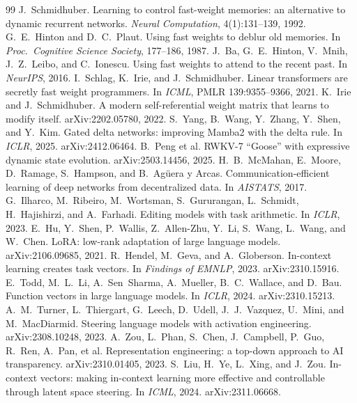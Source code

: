 \documentclass[11pt]{article}
\theoremstyle{definition}
\begin{document}
\begin{thebibliography}{99}
 J.~Schmidhuber. Learning to control fast-weight memories: an alternative to dynamic recurrent networks. \emph{Neural Computation}, 4(1):131--139, 1992.
 G.~E.~Hinton and D.~C.~Plaut. Using fast weights to deblur old memories. In \emph{Proc.\ Cognitive Science Society}, 177--186, 1987.
 J.~Ba, G.~E.~Hinton, V.~Mnih, J.~Z.~Leibo, and C.~Ionescu. Using fast weights to attend to the recent past. In \emph{NeurIPS}, 2016.
 I.~Schlag, K.~Irie, and J.~Schmidhuber. Linear transformers are secretly fast weight programmers. In \emph{ICML}, PMLR 139:9355--9366, 2021.
 K.~Irie and J.~Schmidhuber. A modern self-referential weight matrix that learns to modify itself. arXiv:2202.05780, 2022.
 S.~Yang, B.~Wang, Y.~Zhang, Y.~Shen, and Y.~Kim. Gated delta networks: improving Mamba2 with the delta rule. In \emph{ICLR}, 2025. arXiv:2412.06464.
 B.~Peng et al. RWKV-7 ``Goose'' with expressive dynamic state evolution. arXiv:2503.14456, 2025.
 H.~B.~McMahan, E.~Moore, D.~Ramage, S.~Hampson, and B.~Ag\"uera y Arcas. Communication-efficient learning of deep networks from decentralized data. In \emph{AISTATS}, 2017.
 G.~Ilharco, M.~Ribeiro, M.~Wortsman, S.~Gururangan, L.~Schmidt, H.~Hajishirzi, and A.~Farhadi. Editing models with task arithmetic. In \emph{ICLR}, 2023.
 E.~Hu, Y.~Shen, P.~Wallis, Z.~Allen-Zhu, Y.~Li, S.~Wang, L.~Wang, and W.~Chen. LoRA: low-rank adaptation of large language models. arXiv:2106.09685, 2021.
 R.~Hendel, M.~Geva, and A.~Globerson. In-context learning creates task vectors. In \emph{Findings of EMNLP}, 2023. arXiv:2310.15916.
 E.~Todd, M.~L.~Li, A.~Sen~Sharma, A.~Mueller, B.~C.~Wallace, and D.~Bau. Function vectors in large language models. In \emph{ICLR}, 2024. arXiv:2310.15213.
 A.~M.~Turner, L.~Thiergart, G.~Leech, D.~Udell, J.~J.~Vazquez, U.~Mini, and M.~MacDiarmid. Steering language models with activation engineering. arXiv:2308.10248, 2023.
 A.~Zou, L.~Phan, S.~Chen, J.~Campbell, P.~Guo, R.~Ren, A.~Pan, et al. Representation engineering: a top-down approach to AI transparency. arXiv:2310.01405, 2023.
 S.~Liu, H.~Ye, L.~Xing, and J.~Zou. In-context vectors: making in-context learning more effective and controllable through latent space steering. In \emph{ICML}, 2024. arXiv:2311.06668.

\end{thebibliography}
\end{document}
